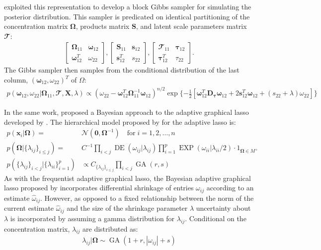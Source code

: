 \documentclass[11pt]{article}
\DeclareMathOperator{\DE}{DE}
\DeclareMathOperator{\EXP}{EXP}
\DeclareMathOperator{\GA}{GA}
\begin{document}
\cite{wang2012} exploited this representation to develop a block Gibbs sampler for simulating the posterior distribution. This sampler is predicated on identical partitioning of the concentration matrix $\boldsymbol{\Omega}$, products matrix $\boldsymbol{S}$, and latent scale parameters matrix $\mathbfcal{T}$:
\begin{align}
\begin{bmatrix}
\boldsymbol{\Omega}_{11} & \boldsymbol{\omega}_{12} \\
\boldsymbol{\omega}_{12}^T & \omega_{22}
\end{bmatrix},
\begin{bmatrix}
\mathbf{S}_{11} & \mathbf{s}_{12} \\
\mathbf{s}_{12}^T & s_{22}
\end{bmatrix},
\begin{bmatrix}
\mathbfcal{T}_{11} & \boldsymbol{\tau}_{12} \\
\boldsymbol{\tau}_{12}^T & \tau_{22}
\end{bmatrix}.
\end{align}
The Gibbs sampler then samples from the conditional distribution of the last column, $(\boldsymbol{\omega}_{12}, \omega_{22})^T$ of $\Omega$:
\begin{align}
p(\boldsymbol{\omega}_{12}, \omega_{22}|\boldsymbol{\Omega}_{11},\mathbfcal{T},\textbf{X},\lambda) \propto \left(\omega_{22}-\boldsymbol{\omega}_{12}^T \boldsymbol{\Omega}_{11}^{-1}\boldsymbol{\omega}_{12} \right)^{n/2} \exp \{ - \frac{1}{2}\left[ \boldsymbol{\omega}_{12}^T \textbf{D}_{\boldsymbol{\tau}} \boldsymbol{\omega}_{12}+ 2 
\textbf{s}_{12}^T \boldsymbol{\omega}_{12} + (s_{22}+\lambda)\omega_{22}\right] \}
\end{align}

In the same work, \cite{wang2012} proposed a Bayesian approach to the adaptive graphical lasso developed by \cite{fan2009}. The hierarchical model proposed by for the adaptive lasso is:
\begin{align}
	p(\mathbf{x}_i|\boldsymbol{\Omega}) = & \mathcal{N}(\mathbf{0,\boldsymbol{\Omega}}^{-1}) \quad \text{for} \; i=1,2,\hdots,n\\
		p(\boldsymbol{\Omega}|\{\lambda_{ij}\}_{i\leq j}) = & C^{-1} \prod_{i<j} \DE(\omega_{ij}|\lambda_{ij}) \prod_{i=1}^{p} \EXP (\omega_{ii} | \lambda_{ii} / 2) \cdot 1_{\boldsymbol{\Omega}\in M^+}\\
		p(\{\lambda_{ij}\}_{i<j}|\{\lambda_{ii}\}_{i=1}^p) &\propto C_{\{\lambda_{ij}\}_{i\leq j}} \prod_{i<j} \GA(r,s)
\end{align}
As with the frequentist adaptive graphical lasso, the Bayesian adaptive graphical lasso proposed by \citep{wang2012} incorporates differential shrinkage of entries $\omega_{ij}$ according to an estimate $\hat{\omega}_{ij}$. However, as opposed to a fixed relationship between the norm of the current estimate $\hat{\omega}_{ij}$ and the size of the shrinkage parameter $\lambda$ uncertainty about $\lambda$ is incorporated by assuming a gamma distribution for $\lambda_{ij}$. Conditional on the concentration matrix, $\lambda_{ij}$ are distributed as:
\begin{align}
\lambda_{ij}|\boldsymbol{\Omega}\sim \GA(1+r,|\omega_{ij}|+s)
\end{align}
\end{document}
